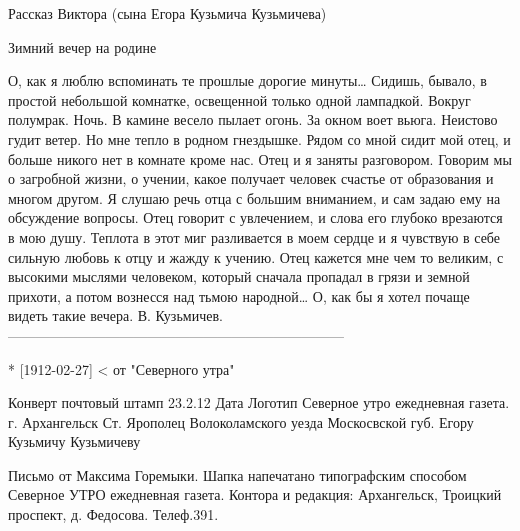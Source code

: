 Рассказ Виктора (сына Егора Кузьмича Кузьмичева)

Зимний вечер на родине

О, как я люблю вспоминать те прошлые дорогие минуты…
Сидишь, бывало, в простой небольшой комнатке, освещенной только одной лампадкой. Вокруг полумрак. Ночь. В камине весело пылает огонь. За окном воет вьюга. Неистово гудит ветер. Но мне тепло в родном гнездышке. Рядом со мной сидит мой отец, и больше никого нет в комнате  кроме нас. Отец и я заняты разговором. Говорим мы о загробной жизни, о учении, какое получает человек счастье от образования и многом другом. Я слушаю речь отца с большим вниманием, и сам задаю ему на обсуждение вопросы. Отец говорит с увлечением, и слова его глубоко врезаются в мою душу. Теплота в этот миг разливается в моем сердце и я чувствую в себе сильную любовь к отцу и жажду к учению. Отец кажется мне чем то великим, с высокими мыслями человеком, который сначала пропадал в грязи и земной прихоти, а потом вознесся над тьмою народной…
О, как бы я хотел почаще видеть такие вечера. 
В. Кузьмичев.
------------------------------------------------------------------------


* [1912-02-27] < от "Северного утра"

Конверт
почтовый штамп 23.2.12
Дата
Логотип
Северное утро
ежедневная газета.
г. Архангельск
Ст. Ярополец Волоколамского уезда Москосвской губ.
Егору Кузьмичу Кузьмичеву

Письмо от Максима Горемыки.
Шапка напечатано типографским способом
Северное
УТРО
ежедневная газета.
Контора и редакция:
Архангельск,
Троицкий проспект, д. Федосова.
Телеф.391.

